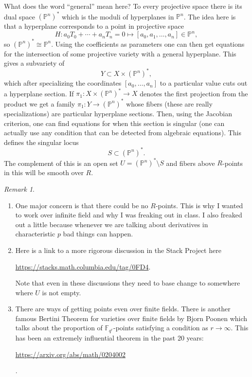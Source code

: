 \documentclass[12pt]{article}
\numberwithin{equation}{section}
\theoremstyle{definition}
\theoremstyle{remark}
\newtheorem{remark}[theorem]{Remark}
\newcommand{\FF}{\mathbb{F}}
\newcommand{\PP}{\mathbb{P}}
\begin{document}
What does the word ``general'' mean here?
To every projective space there is its dual space $(\PP^n)^*$ which is the moduli of hyperplanes in $\PP^n$. 
The idea here is that a hyperplane corresponds to a point in projective space 
 $$ H: a_0 T_0 + \cdots + a_n T_n =0 \mapsto  [a_0,a_1,\ldots,a_n]\in \PP^n,$$
so $(\PP^n)^*\cong \PP^n$. 
Using the coefficients as parameters one can then get equations for the intersection of some projective variety with a general hyperplane. 
This gives a subvariety of 
 $$ Y \subset X\times (\PP^n)^*,$$
which after specializing the coordinates $[a_0,\ldots,a_n]$ to a particular value cuts out a hyperplane section. 
If $\pi_1: X \times (\PP^n)^*\to X$ denotes the first projection from the product we get a family $\pi_1:Y \to (\PP^n)^*$ whose fibers (these are really specializations) are particular hyperplane sections.
Then, using the Jacobian criterion, one can find equations for when this section is singular (one can actually use any condition that can be detected from algebraic equations).
This defines the singular locus
 $$ S \subset (\PP^n)^*. $$
The complement  of this is an open set $U = (\PP^n)^*\setminus S$ and fibers above $R$-points in this will be smooth over $R$.

\begin{remark}
\begin{enumerate}
	\item One major concern is that there could be no $R$-points. This is why I wanted to work over infinite field and why I was freaking out in class. 
	I also freaked out a little because whenever we are talking about derivatives in characteristic $p$ bad things can happen.
	\item Here is a link to a more rigorous discussion in the Stack Project here
	\begin{center}
	 \url{https://stacks.math.columbia.edu/tag/0FD4}.
	 \end{center}
 	Note that even in these discussions they need to base change to somewhere where $U$ is not empty. 
	\item There are ways of getting points even over finite fields. 
	There is another famous Bertini Theorem for varieties over finite fields by Bjorn Poonen which talks about the proportion of $\FF_{q^r}$-points satisfying a condition as $r\to \infty$. 
	This has been an extremely influential theorem in the past 20 years:
	\begin{center} 
		\url{https://arxiv.org/abs/math/0204002}
	\end{center}.
\end{enumerate}

\end{remark}
\end{document}
